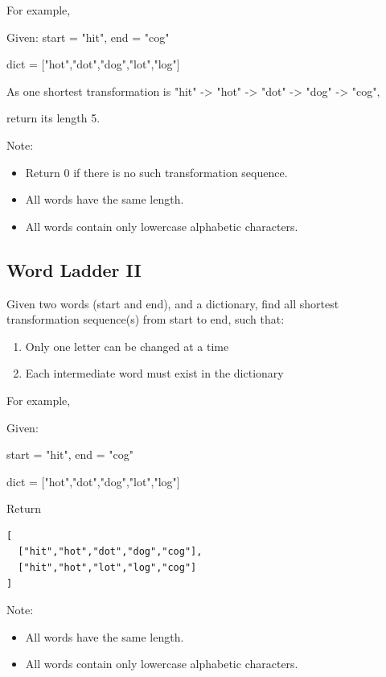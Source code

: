 \documentclass[11pt]{book}
\begin{document}
For example,

Given:
start = "hit", end = "cog"

dict = ["hot","dot","dog","lot","log"]

As one shortest transformation is "hit" -> "hot" -> "dot" -> "dog" -> "cog",

return its length 5.

Note:
\begin{itemize}
\item Return 0 if there is no such transformation sequence.
\item All words have the same length.
\item All words contain only lowercase alphabetic characters.
\end{itemize}

\subsection{Word Ladder II}
\label{sec-18-2-2}
Given two words (start and end), and a dictionary, find all shortest transformation sequence(s) from start to end, such that:
\begin{enumerate}
\item Only one letter can be changed at a time
\item Each intermediate word must exist in the dictionary
\end{enumerate}
For example,

Given:

start = "hit", end = "cog"

dict = ["hot","dot","dog","lot","log"]

Return
\lstset{language=java,label= ,caption= ,numbers=none}
\begin{lstlisting}
[
  ["hit","hot","dot","dog","cog"],
  ["hit","hot","lot","log","cog"]
]
\end{lstlisting}

Note:
\begin{itemize}
\item All words have the same length.
\item All words contain only lowercase alphabetic characters.
\end{itemize}
\end{document}
